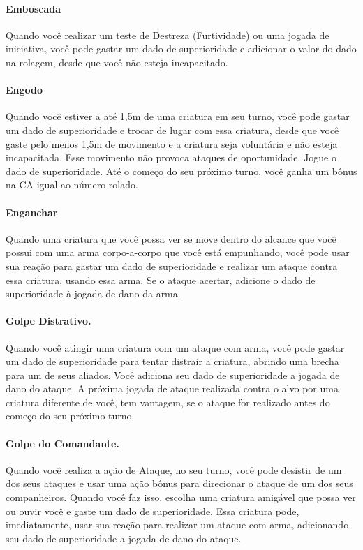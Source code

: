 \documentclass{RPG_Adventure}[2021/10/20]
\begin{document}
\begin{multicols}{2}
\paragraph{Emboscada} Quando você realizar um teste de Destreza (Furtividade) ou
uma jogada de iniciativa, você pode gastar um dado de superioridade e adicionar
o valor do dado na rolagem, desde que você não esteja incapacitado.

\paragraph{Engodo} Quando você estiver a até 1,5m de uma criatura em seu turno,
você pode gastar um dado de superioridade e trocar de lugar com essa criatura,
desde que você gaste pelo menos 1,5m de movimento e a criatura seja voluntária e
não esteja incapacitada. Esse movimento não provoca ataques de oportunidade.
Jogue o dado de superioridade. Até o começo do seu próximo turno, você ganha um
bônus na CA igual ao número rolado.

\paragraph{Enganchar} Quando uma criatura que você possa ver se move dentro do
alcance que você possui com uma arma corpo-a-corpo que você está empunhando,
você pode usar sua reação para gastar um dado de superioridade e realizar um
ataque contra essa criatura, usando essa arma. Se o ataque acertar, adicione o
dado de superioridade à jogada de dano da arma.

\paragraph{Golpe Distrativo.} Quando você atingir uma criatura com um ataque com
arma, você pode gastar um dado de superioridade para tentar distrair a criatura,
abrindo uma brecha para um de seus aliados. Você adiciona seu dado de
superioridade a jogada de dano do ataque. A próxima jogada de ataque realizada
contra o alvo por uma criatura diferente de você, tem vantagem, se o ataque for
realizado antes do começo do seu próximo turno.

\paragraph{Golpe do Comandante.} Quando você realiza a ação de Ataque, no seu
turno, você pode desistir de um dos seus ataques e usar uma ação bônus para
direcionar o ataque de um dos seus companheiros. Quando você faz isso, escolha
uma criatura amigável que possa ver ou ouvir você e gaste um dado de
superioridade. Essa criatura pode, imediatamente, usar sua reação para realizar
um ataque com arma, adicionando seu dado de superioridade a jogada de dano do
ataque.


\end{multicols}
\end{document}

